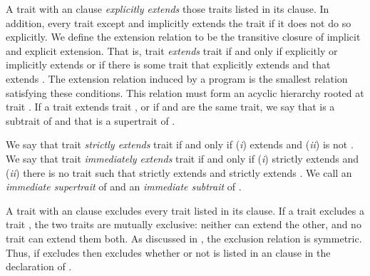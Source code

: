 A trait with an  clause
\emph{explicitly extends} those traits listed in its  clause.
In addition, every trait except  and 
implicitly extends the trait 
if it does not do so explicitly.
We define the extension relation to be the transitive closure
of implicit and
explicit extension.
That is, trait  \emph{extends} trait 
if and only if  explicitly or implicitly
extends  or if there is some trait 
that  explicitly extends and that extends .
The extension relation induced by a program is the smallest
relation satisfying these conditions.
This relation must form an acyclic hierarchy
rooted at trait .
If a trait  extends trait ,
or if  and  are the same trait,
we say that  is a subtrait of 
and that  is a supertrait of .

We say that trait  \emph{strictly extends} trait 
if and only if
(\emph{i})  extends  and (\emph{ii})  is not .
We say that trait  \emph{immediately extends} trait 
if and only if (\emph{i})  strictly extends  and
(\emph{ii}) there is no trait 
such that  strictly extends 
and  strictly extends .
We call  an \emph{immediate supertrait} of 
and  an \emph{immediate subtrait} of .

A trait with an  clause excludes
every trait listed in its  clause.
If a trait  excludes a trait ,
the two traits are mutually exclusive:
neither can extend the other, and no trait can extend them both.
As discussed in ,
the exclusion relation is symmetric.
Thus, if  excludes 
then  excludes 
whether or not  is listed in an  clause
in the declaration of .

